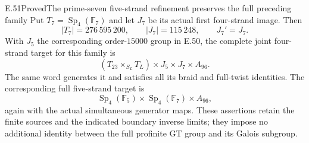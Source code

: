 \begin{statement}{E.51}{Proved}{The prime-seven five-strand refinement preserves the full preceding family}
Put $T_7=\operatorname{Sp}_4(\mathbb F_7)$ and let $J_7$ be
its actual first four-strand image.  Then
\[
 |T_7|=276\,595\,200,\qquad |J_7|=115\,248,\qquad J_7'=J_7.
\tag{E.51.5}
\]
With $J_5$ the corresponding order-$15000$ group in E.50,
the complete joint four-strand target for this family is
\[
       (T_{23}\times_{S_L}T_L)\times J_5\times J_7\times A_{96}.
\tag{E.51.6}
\]
The same word generates it and satisfies all its braid and
full-twist identities.  The corresponding full five-strand
target is
\[
          \operatorname{Sp}_4(\mathbb F_5)
               \times\operatorname{Sp}_4(\mathbb F_7)\times A_{96},
\tag{E.51.7}
\]
again with the actual simultaneous generator maps.  These
assertions retain the finite sources and the indicated
boundary inverse limits; they impose no additional identity
between the full profinite GT group and its Galois subgroup.
\end{statement}

